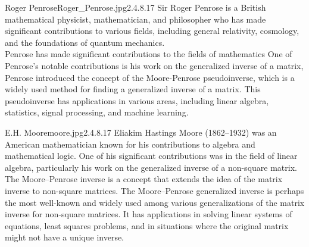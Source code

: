 \documentclass[]{article}
\begin{document}
\begin{enrichment}{Roger Penrose}{Roger_Penrose.jpg}{2.4}{.8}{.17}
        Sir Roger Penrose is a British mathematical physicist, mathematician, and philosopher 
        who has made significant contributions to various fields, including general relativity, 
        cosmology, and the foundations of quantum mechanics. \\
        Penrose has made significant contributions to the fields of mathematics
        One of Penrose's notable contributions is his work on the generalized inverse of a matrix, 
        Penrose introduced the concept of the Moore-Penrose pseudoinverse, 
        which is a widely used method for finding a generalized inverse of a matrix. 
        This pseudoinverse has applications in various areas, including linear algebra, 
        statistics, signal processing, and machine learning.
\end{enrichment}
\begin{enrichment}{E.H. Moore}{moore.jpg}{2.4}{.8}{.17}
        Eliakim Hastings Moore (1862–1932) was an American mathematician known for his contributions to algebra and mathematical logic. 
        One of his significant contributions was in the field of linear algebra, 
        particularly his work on the generalized inverse of a non-square matrix.
        The Moore–Penrose inverse is a concept that extends the idea of the matrix inverse to non-square matrices.
        The Moore–Penrose generalized inverse is perhaps the most well-known and widely used among 
        various generalizations of the matrix inverse for non-square matrices. 
        It has applications in solving linear systems of equations, 
        least squares problems, and in situations where the original matrix might not have a unique inverse.
\end{enrichment}
\end{document}
